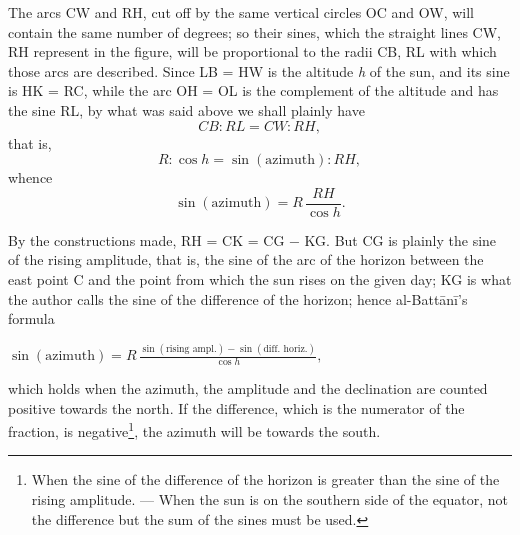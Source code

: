 \documentclass[11pt]{article}
\begin{document}
\par The arcs CW and RH, cut off by the same vertical circles OC and OW, will contain the same number of degrees; so their sines, which the straight lines CW, RH represent in the figure, will be proportional to the radii CB, RL with which those arcs are described. Since LB = HW is the altitude \emph{h} of the sun, and its sine is HK = RC, while the arc OH = OL is the complement of the altitude and has the sine RL, by what was said above we shall plainly have \[ CB : RL = CW : RH, \] that is, \[ R : \cos h = \sin(\text{azimuth}) : RH, \] whence \[ \sin(\text{azimuth}) = R\,\frac{RH}{\cos h}. \]\par
\par By the constructions made, RH = CK = CG − KG. But CG is plainly the sine of the rising amplitude, that is, the sine of the arc of the horizon between the east point C and the point from which the sun rises on the given day; KG is what the author calls the sine of the difference of the horizon; hence al-Battānī's formula \par\noindent\hspace*{1.5em}$\displaystyle \sin(\text{azimuth}) = R\,\frac{\sin(\text{rising ampl.}) - \sin(\text{diff. horiz.})}{\cos h},$\par which holds when the azimuth, the amplitude and the declination are counted positive towards the north. If the difference, which is the numerator of the fraction, is negative\footnote{When the sine of the difference of the horizon is greater than the sine of the rising amplitude. — When the sun is on the southern side of the equator, not the difference but the sum of the sines must be used.}, the azimuth will be towards the south.\par
\end{document}
